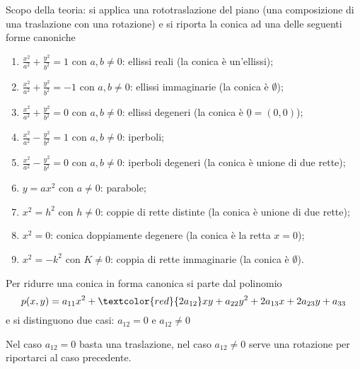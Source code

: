 Scopo della teoria: si applica una rototraslazione del piano (una composizione di una traslazione con una rotazione) e si riporta la conica ad una delle seguenti forme canoniche
\begin{enumerate}
    \item $\displaystyle\frac{x^{2}}{a^{2}}+\frac{y^{2}}{b^{2}}=1$ con $ a,b\neq 0 $: ellissi reali (la conica è un'ellissi);
    \item $\displaystyle\frac{x^{2}}{a^{2}}+\frac{y^{2}}{b^{2}}=-1$ con $ a,b\neq 0 $: ellissi immaginarie (la conica è $ \emptyset $);
    \item $\displaystyle\frac{x^{2}}{a^{2}}+\frac{y^{2}}{b^{2}}=0$ con $ a,b\neq 0 $: ellissi degeneri (la conica è $ \underline{0}=(0,0) $);
    \item $\displaystyle\frac{x^{2}}{a^{2}}-\frac{y^{2}}{b^{2}}=1$ con $ a,b\neq 0 $: iperboli;
    \item $\displaystyle\frac{x^{2}}{a^{2}}-\frac{y^{2}}{b^{2}}=0$ con $ a,b\neq 0 $: iperboli degeneri (la conica è unione di due rette);
    \item $ \displaystyle y = ax^{2} $ con $ a\neq 0 $: parabole;
    \item $ x^{2}=h^{2} $ con $ h\neq 0 $: coppie di rette distinte (la conica è unione di due rette);
    \item $ x^{2}=0 $: conica doppiamente degenere (la conica è la retta $ x=0 $);
    \item $ x^{2}=-k^{2} $ con $ K\neq 0 $: coppia di rette immaginarie (la conica è $ \emptyset $).
\end{enumerate}


Per ridurre una conica in forma canonica si parte dal polinomio \[
    p(x,y)=a_{11} x^{2} + \textcolor{red}{2 a_{12}} xy + a_{22}y^{2} + 2 a_{13}x + 2 a_{23} y + a_{33}
\] e si distinguono due casi: $ a_{12}=0 $ e $ a_{12}\neq 0 $

Nel caso $ a_{12}=0 $ basta una traslazione, nel caso $ a_{12}\neq 0 $ serve una rotazione per riportarci al caso precedente.


